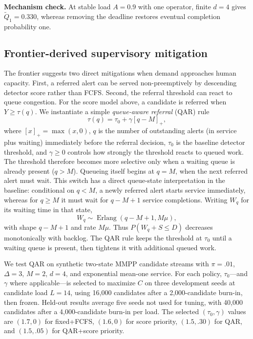 \documentclass[letterpaper,10pt,conference]{ieeeconf}
\begin{document}
\textbf{Mechanism check.} At stable load \(A=0.9\) with one operator,
finite \(d=4\) gives \(\widetilde Q_1=0.330\), whereas removing the deadline
restores eventual completion probability one.

\subsection{Frontier-derived supervisory mitigation}
\label{sec:qar}

The frontier suggests two direct mitigations when demand approaches human capacity. First, a referred alert can be served non-preemptively by descending detector score rather than FCFS. Second, the referral threshold can react to queue congestion. For the score model above, a candidate is referred when \(Y\ge\tau(q)\). We instantiate a simple \emph{queue-aware referral} (QAR) rule
\begin{equation}
\tau(q)=\tau_0+\gamma[q-M]_+,
\label{eq:qar}
\end{equation}
where \([x]_+=\max(x,0)\), \(q\) is the number of outstanding alerts (in service plus waiting) immediately before the referral decision, \(\tau_0\) is the baseline detector threshold, and \(\gamma\ge0\) controls how strongly the threshold reacts to queued work. The threshold therefore becomes more selective only when a waiting queue is already present (\(q>M\)). Queueing itself begins at \(q=M\), when the next referred alert must wait. This switch has a direct queue-state interpretation in the baseline: conditional on \(q<M\), a newly referred alert starts service immediately, whereas for \(q\ge M\) it must wait for \(q-M+1\) service completions. Writing \(W_q\) for its waiting time in that state,
\begin{equation}
W_q\sim\operatorname{Erlang}(q-M+1,M\mu),
\label{eq:state-wait}
\end{equation}
with shape \(q-M+1\) and rate \(M\mu\). Thus \(P(W_q+S\le D)\) decreases monotonically with backlog. The QAR rule keeps the threshold at \(\tau_0\) until a waiting queue is present, then tightens it with additional queued work.

We test QAR on synthetic two-state MMPP candidate streams with \(\pi=.01\), \(\Delta=3\), \(M=2\), \(d=4\), and exponential mean-one service. For each policy, \(\tau_0\)---and \(\gamma\) where applicable---is selected to maximize \(C\) on three development seeds at candidate load \(L=14\), using 16,000 candidates after a 2,000-candidate burn-in, then frozen. Held-out results average five seeds not used for tuning, with 40,000 candidates after a 4,000-candidate burn-in per load. The selected \((\tau_0,\gamma)\) values are \((1.7,0)\) for fixed+FCFS, \((1.6,0)\) for score priority, \((1.5,.30)\) for QAR, and \((1.5,.05)\) for QAR+score priority.
\end{document}
